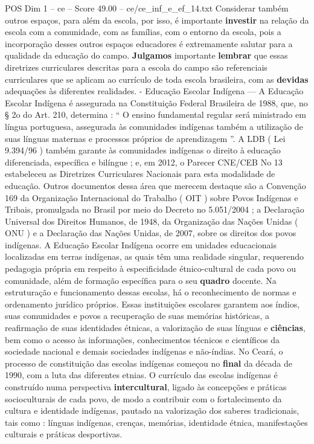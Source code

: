 \begin{textsample}{POS Dim 1 – ce – Score 49.00 – ce/ce\_inf\_e\_ef\_14.txt}
Considerar também outros espaços, para além da escola, por isso, é importante \textbf{investir} na relação da escola com a comunidade, com as famílias, com o entorno da escola, pois a incorporação desses outros espaços educadores é extremamente salutar para a qualidade da educação do campo. \textbf{Julgamos} importante \textbf{lembrar} que essas diretrizes curriculares descritas para a escola do campo são referenciais curriculares que se aplicam ao currículo de toda escola brasileira, com as \textbf{devidas} adequações às diferentes realidades. - Educação Escolar Indígena — A Educação Escolar Indígena é assegurada na Constituição Federal Brasileira de 1988, que, no § 2o do Art. 210, determina : “ O ensino fundamental regular será ministrado em língua portuguesa, assegurada às comunidades indígenas também a utilização de suas línguas maternas e processos próprios de aprendizagem ”.
A LDB ( Lei 9.394/96 ) também garante às comunidades indígenas o direito à educação diferenciada, específica e bilíngue ; e, em 2012, o Parecer CNE/CEB No 13 estabeleceu as Diretrizes Curriculares Nacionais para esta modalidade de educação.
Outros documentos dessa área que merecem destaque são a Convenção 169 da Organização Internacional do Trabalho ( OIT ) sobre Povos Indígenas e Tribais, promulgada no Brasil por meio do Decreto no 5.051/2004 ; a Declaração Universal dos Direitos Humanos, de 1948, da Organização das Nações Unidas ( ONU ) e a Declaração das Nações Unidas, de 2007, sobre os direitos dos povos indígenas.
A Educação Escolar Indígena ocorre em unidades educacionais localizadas em terras indígenas, as quais têm uma realidade singular, requerendo pedagogia própria em respeito à especificidade étnico-cultural de cada povo ou comunidade, além de formação específica para o seu \textbf{quadro} docente.
Na estruturação e funcionamento dessas escolas, há o reconhecimento de normas e ordenamento jurídico próprios.
Essas instituições escolares garantem aos índios, suas comunidades e povos a recuperação de suas memórias históricas, a reafirmação de suas identidades étnicas, a valorização de suas línguas e \textbf{ciências}, bem como o acesso às informações, conhecimentos técnicos e científicos da sociedade nacional e demais sociedades indígenas e não-índias.
No Ceará, o processo de constituição das escolas indígenas começou no \textbf{final} da década de 1990, com a luta das diferentes etnias.
O currículo das escolas indígenas é construído numa perspectiva \textbf{intercultural}, ligado às concepções e práticas socioculturais de cada povo, de modo a contribuir com o fortalecimento da cultura e identidade indígenas, pautado na valorização dos saberes tradicionais, tais como : línguas indígenas, crenças, memórias, identidade étnica, manifestações culturais e práticas desportivas.

\end{textsample}
